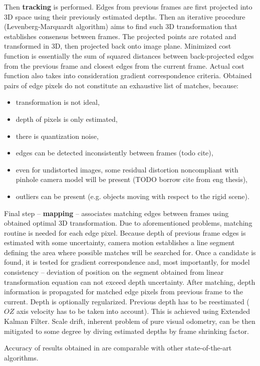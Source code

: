 Then \textbf{tracking} is performed. Edges from previous frames are first projected into 3D space using their previously estimated depths. Then an iterative procedure (Levenberg-Marquardt algorithm) aims to find such 3D transformation that establishes consensus between frames. The projected points are rotated and transformed in 3D, then projected back onto image plane. Minimized cost function is essentially the sum of squared distances between back-projected edges from the previous frame and closest edges from the current frame. Actual cost function also takes into consideration gradient correspondence criteria. Obtained pairs of edge pixels do not constitute an exhaustive list of matches, because:
\begin{itemize}
\item transformation is not ideal,
\item depth of pixels is only estimated,
\item there is quantization noise,
\item edges can be detected inconsistently between frames (todo cite),
\item even for undistorted images, some residual distortion noncompliant with pinhole camera model will be present (TODO borrow cite from eng thesis),
\item outliers can be present (e.g. objects moving with respect to the rigid scene).
\end{itemize}
 
Final step -- \textbf{mapping} -- associates matching edges between frames using obtained optimal 3D transformation. Due to aforementioned problems, matching routine is needed for each edge pixel. Because depth of previous frame edges is estimated with some uncertainty, camera motion establishes a line segment defining the area where possible matches will be searched for. Once a candidate is found, it is tested for gradient correspondence and, most importantly, for model consistency -- deviation of position on the segment obtained from linear transformation equation can not exceed depth uncertainty. After matching, depth information is propagated for matched edge pixels from previous frame to the current. Depth is optionally regularized. Previous depth has to be reestimated ($OZ$ axis velocity has to be taken into account). This is achieved using Extended Kalman Filter. Scale drift, inherent problem of pure visual odometry, can be then mitigated to some degree by diving estimated depths by frame shrinking factor.

Accuracy of results obtained in \cite{jose2015realtime} are comparable with other state-of-the-art algorithms.


